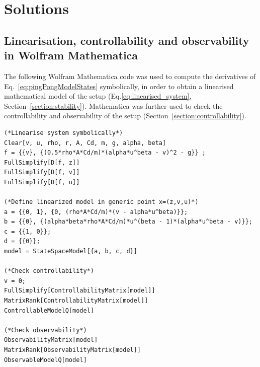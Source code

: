 \documentclass[10pt,twoside,openright]{article}
\newcounter{opgave}[section]\setcounter{opgave}{0}
\renewcommand{\theopgave}{\arabic{section}.\arabic{opgave}}
\newenvironment{opgave}[2][]{%
	\refstepcounter{opgave}
	\label{#2}
	\mdfsetup{%
		frametitle={%
			\tikz[baseline=(current bounding box.east),outer sep=0pt]
			\node[anchor=east,rectangle,fill=gray!40]
			{\strut Exercise~\theopgave:~#1};}%
	}
	\mdfsetup{%
		innertopmargin=10pt,linecolor=white!30,%
		linewidth=0pt,topline=true,%
		frametitleaboveskip=\dimexpr-\ht\strutbox\relax%
	}

	\begin{mdframed}[]\relax}{%
\end{mdframed}}
\newlength{\lvaklength}
\newcommand{\leegvak}[2]{\noindent\framebox[#1]{\parbox{#1}{\vspace{#2}}}}
\newcommand{\leegvakf}[1]{
\setlength{\lvaklength}{0cm}
\addtolength{\lvaklength}{0.925\textwidth}
\leegvak{\lvaklength}{#1}
}
\begin{document}
%		
%		
%	

\section{Solutions}

\subsection*{Linearisation, controllability and observability in Wolfram Mathematica}

The following Wolfram Mathematica code was used to compute the derivatives of Eq.~\ref{eq:pingPongModelStates} symbolically, in order to obtain a linearised mathematical model of the setup (Eq.\ref{eq:linearised_system}, Section~\ref{section:stability}). Mathematica was further used to check the controllability and observability of the setup (Section~\ref{section:controllability}). 

\begin{lstlisting}[style=mathematica]
(*Linearise system symbolically*)
Clear[v, u, rho, r, A, Cd, m, g, alpha, beta]
f = {{v}, {(0.5*rho*A*Cd/m)*(alpha*u^beta - v)^2 - g}} ;
FullSimplify[D[f, z]]
FullSimplify[D[f, v]]
FullSimplify[D[f, u]]

(*Define linearized model in generic point x=(z,v,u)*)
a = {{0, 1}, {0, (rho*A*Cd/m)*(v - alpha*u^beta)}};
b = {{0}, {(alpha*beta*rho*A*Cd/m)*u^(beta - 1)*(alpha*u^beta - v)}};
c = {{1, 0}};
d = {{0}};
model = StateSpaceModel[{a, b, c, d}]

(*Check controllability*)
v = 0;
FullSimplify[ControllabilityMatrix[model]]
MatrixRank[ControllabilityMatrix[model]]
ControllableModelQ[model]

(*Check observability*)
ObservabilityMatrix[model]
MatrixRank[ObservabilityMatrix[model]]
ObservableModelQ[model]
\end{lstlisting}
\end{document}

